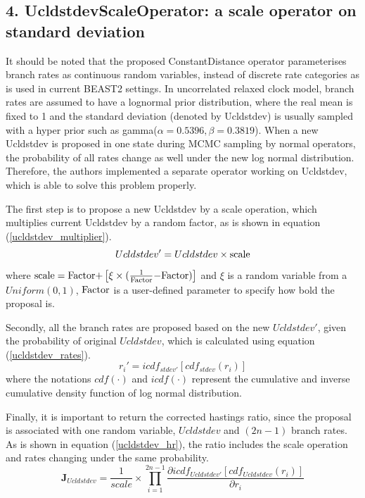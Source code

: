 \documentclass{bmcart}
\begin{document}
\begin{backmatter}
\subsection*{4. UcldstdevScaleOperator: a scale operator on standard deviation}\label{UcldstdevScaler}

It should be noted that the proposed ConstantDistance operator parameterises branch rates as continuous random variables, instead of discrete rate categories as is used in current BEAST2 settings. In uncorrelated relaxed clock model, branch rates are assumed to have a lognormal prior distribution, where the real mean is fixed to 1 and the standard deviation (denoted by Ucldstdev) is usually sampled with a hyper prior such as gamma($\alpha = 0.5396, \beta = 0.3819$). When a new Ucldstdev is proposed in one state during MCMC sampling by normal operators, the probability of all rates change as well under the new log normal distribution. Therefore, the authors implemented a separate operator working on Ucldstdev, which is able to solve this problem properly. 

The first step is to propose a new Ucldstdev by a scale operation, which multiplies  current Ucldstdev by a random factor, as is shown in equation (\ref{ucldstdev_multiplier}).
\begin{equation}\label{ucldstdev_multiplier}
Ucldstdev' = Ucldstdev \times {\rm{scale}}
\end{equation}
where ${\rm{scale = Factor  +  }}\left[ {\xi  \times {\rm{(}}\frac{1}{{{\rm{Factor}}}}{\rm{  -  Factor)}}} \right]$ and  $\xi$ is a random variable from a $Uniform(0,1)$,  ${\rm{Factor}}$ is a user-defined parameter to specify how bold the proposal is.

Secondly, all the branch rates are proposed based on the new $Ucldstdev'$, given the probability of original $Ucldstdev$, which is calculated using equation (\ref{ucldstdev_rates}).
\begin{equation}\label{ucldstdev_rates}
r_{i}' = icd{f_{stdev'}}\left[ {cd{f_{stdev}}({r_i})} \right]
\end{equation}
where the notations $cdf(\cdot)$ and $icdf(\cdot)$ represent the cumulative and inverse cumulative density function of log normal distribution.

Finally, it is important to return the corrected hastings ratio, since the proposal is associated with one random variable, $Ucldstdev$ and $(2n-1)$ branch rates. As is shown in equation (\ref{ucldstdev_hr}), the ratio includes the scale operation and rates changing under the same probability.
\begin{equation}\label{ucldstdev_hr}
{{\mathbf{J}}_{Ucldstdev}} = \frac{1}{{scale}} \times \prod\limits_{i = 1}^{2n - 1} {\frac{{\partial icd{f_{Ucldstdev'}}[cd{f_{Ucldstdev}}({r_i})]}}{{\partial {r_i}}}}
\end{equation}


\end{backmatter}
\end{document}
